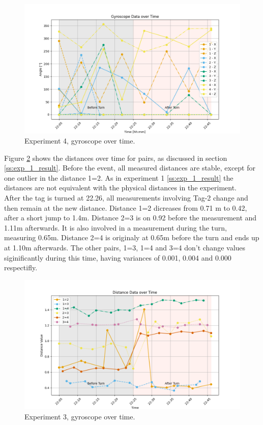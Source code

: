 \begin{figure}[ht!]
	\includegraphics[width=\linewidth]{graphics/exp/exp4_gyro_data_plot_1.png}
	\caption{Experiment 4, gyroscope over time.}
	\label{f:exp4_graphs_gyro}
\end{figure}

Figure \ref{f:exp4_graphs_dist} shows the distances over time for pairs, as discussed in section \ref{ss:exp_1_result}.
Before the event, all measured distances are stable, except for one outlier in the distance 1=2.
As in experiment 1 \ref{ss:exp_1_result} the distances are not equivalent with the physical distances in the experiment.\\
After the tag is turned at 22.26, all measurements involving Tag-2 change and then remain at the new distance.
Distance 1=2 dicreases from 0.71 m to 0.42, after a short jump to 1.4m.
Distance 2=3 is on 0.92 before the measurement and 1.11m afterwards. It is also involved in a measurement during the turn, measuring 0.65m.
Distance 2=4 is originaly at 0.65m before the turn and ends up at 1.10m afterwards.
The other pairs, 1=3, 1=4 and 3=4 don't change values siginificantly during this time, having variances of 0.001, 0.004 and 0.000 respectifly.

\begin{figure}[ht!]
	\includegraphics[width=\linewidth]{graphics/exp/exp4_dist_data_plot_1.png}
	\caption{Experiment 3, gyroscope over time.}
	\label{f:exp4_graphs_dist}
\end{figure}


